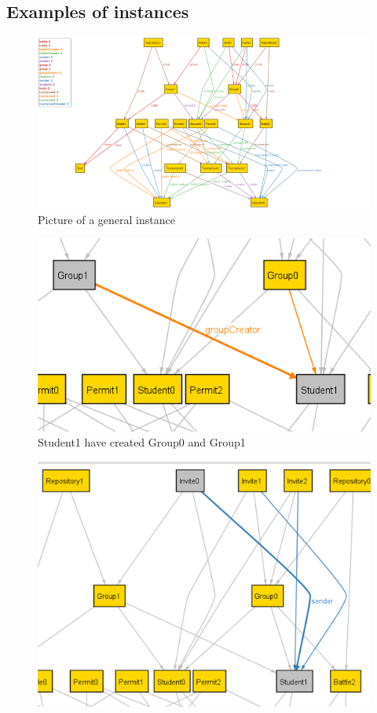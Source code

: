\documentclass{article}
\begin{document}
{\subsection{Examples of instances}
\begin{figure}[H]
    \centering
    \hspace*{-3cm}\includegraphics[scale=1.5]{images/ALLOY/AlloyInstance1.png}
    \caption{Picture of a general instance}
    \label{fig:Picture of a general instance}
\end{figure}
\begin{figure}[H]
    \centering
    \includegraphics{images/ALLOY/groupCreator.png}
    \caption{Student1 have created Group0 and Group1}
    \label{fig:group creation}
\end{figure}
\begin{figure}[H]
    \centering
    \includegraphics{images/ALLOY/sender.png}

\end{figure}}
\end{document}
